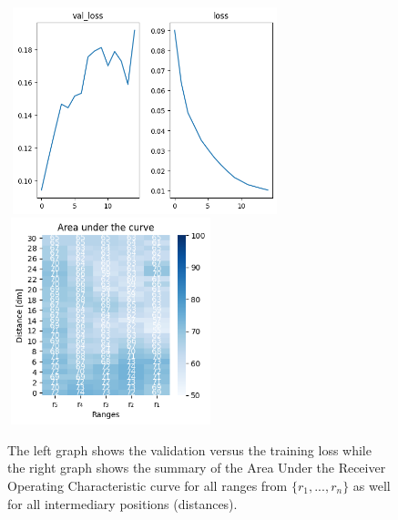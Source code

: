 \begin{multicols}{2}
\end{multicols}\begin{figure}[H]%
\centering
\includegraphics[width=8cm,height=6cm]{3_models/models_20/graph_20.png}
\hspace{0.2 cm}
\includegraphics[width=6cm,height=6cm]{4_plots/plots_20/AUC_20.png}
\caption{The left graph shows the validation versus the training loss while the right graph shows the summary of the Area Under the Receiver Operating Characteristic curve for all ranges from $\{r_{1}, ... ,r_{n}\}$ as well for all intermediary positions (distances).}
\label{auc_20}
\end{figure}


\newpage
